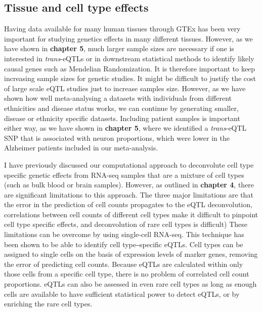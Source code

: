 \subsection{Tissue and cell type effects}
Having data available for many human tissues through GTEx\cite{thegtexconsortiumGTExConsortiumAtlas2020} has been very important for studying genetics effects in many different tissues. However, as we have shown in \textbf{chapter 5}, much larger sample sizes are necessary if one is interested in \emph{trans}-eQTLs or in downstream statistical methods to identify likely causal genes such as Mendelian Randomization. It is therefore important to keep increasing sample sizes for genetic studies. It might be difficult to justify the cost of large scale eQTL studies just to increase samples size. However, as we have shown how well meta-analysing a datasets with individuals from different ethnicities and disease status works, we can continue by generating smaller, disease or ethnicity specific datasets. Including patient samples is important either way, as we have shown in \textbf{chapter 5}, where we identified a \emph{trans}-eQTL SNP that is associated with neuron proportions, which were lower in the Alzheimer patients included in our meta-analysis. 

I have previously discussed our computational approach to deconvolute cell type specific genetic effects from RNA-seq samples that are a mixture of cell types (such as bulk blood or brain samples). However, as outlined in \textbf{chapter 4}, there are significant limitations to this approach. The three major limitations are that the error in the prediction of cell counts propagates to the eQTL deconvolution, correlations between cell counts of different cell types make it difficult to pinpoint cell type specific effects, and deconvolution of rare cell types is difficult) These limitations can be overcome by using single-cell RNA-seq\cite{tangMRNASeqWholetranscriptomeAnalysis2009}. This technique has been shown to be able to identify cell type‒specific eQTLs\cite{wijstSinglecellRNASequencing2018}. Cell types can be assigned to single cells on the basis of expression levels of marker genes, removing the error of predicting cell counts. Because eQTLs are calculated within only those cells from a specific cell type, there is no problem of correlated cell count proportions. eQTLs can also be assessed in even rare cell types as long as enough cells are available to have sufficient statistical power to detect eQTLs, or by enriching the rare cell types.


